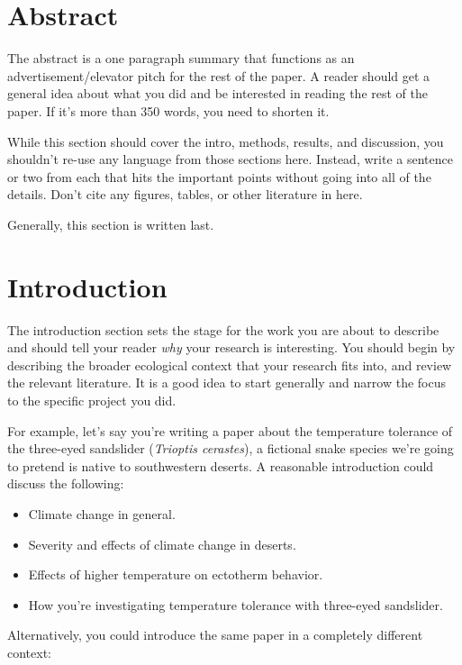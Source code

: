 \documentclass[]{book}
\providecommand{\tightlist}{%
  \setlength{\itemsep}{0pt}\setlength{\parskip}{0pt}}
\begin{document}
\section{Abstract}\label{abstract}

The abstract is a one paragraph summary that functions as an
advertisement/elevator pitch for the rest of the paper. A reader should
get a general idea about what you did and be interested in reading the
rest of the paper. If it's more than 350 words, you need to shorten it.

While this section should cover the intro, methods, results, and
discussion, you shouldn't re-use any language from those sections here.
Instead, write a sentence or two from each that hits the important
points without going into all of the details. Don't cite any figures,
tables, or other literature in here.

Generally, this section is written last.

\section{Introduction}\label{introduction}

The introduction section sets the stage for the work you are about to
describe and should tell your reader \emph{why} your research is
interesting. You should begin by describing the broader ecological
context that your research fits into, and review the relevant
literature. It is a good idea to start generally and narrow the focus to
the specific project you did.

For example, let's say you're writing a paper about the temperature
tolerance of the three-eyed sandslider (\emph{Trioptis cerastes}), a
fictional snake species we're going to pretend is native to southwestern
deserts. A reasonable introduction could discuss the following:

\begin{itemize}
\tightlist
\item
  Climate change in general.
\item
  Severity and effects of climate change in deserts.
\item
  Effects of higher temperature on ectotherm behavior.
\item
  How you're investigating temperature tolerance with three-eyed
  sandslider.
\end{itemize}

Alternatively, you could introduce the same paper in a completely
different context:
\end{document}
